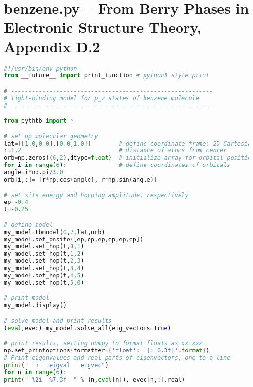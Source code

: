 \documentclass{cthhw}
\begin{document}
\section*{{\sc benzene.py} -- From Berry Phases in Electronic Structure Theory, Appendix D.2}
\begin{lstlisting}[language=Python]
#!/usr/bin/env python
from __future__ import print_function # python3 style print

# ----------------------------------------------------------
# Tight-binding model for p_z states of benzene molecule
# ----------------------------------------------------------

from pythtb import *

# set up molecular geometry
lat=[[1.0,0.0],[0.0,1.0]]        # define coordinate frame: 2D Cartesian
r=1.2                            # distance of atoms from center
orb=np.zeros((6,2),dtype=float)  # initialize array for orbital positions
for i in range(6):               # define coordinates of orbitals
angle=i*np.pi/3.0
orb[i,:]= [r*np.cos(angle), r*np.sin(angle)]

# set site energy and hopping amplitude, respectively
ep=-0.4
t=-0.25

# define model
my_model=tbmodel(0,2,lat,orb)
my_model.set_onsite([ep,ep,ep,ep,ep,ep])
my_model.set_hop(t,0,1)
my_model.set_hop(t,1,2)
my_model.set_hop(t,2,3)
my_model.set_hop(t,3,4)
my_model.set_hop(t,4,5)
my_model.set_hop(t,5,0)

# print model
my_model.display()

# solve model and print results
(eval,evec)=my_model.solve_all(eig_vectors=True)

# print results, setting numpy to format floats as xx.xxx
np.set_printoptions(formatter={'float': '{: 6.3f}'.format})
# Print eigenvalues and real parts of eigenvectors, one to a line
print("  n   eigval   eigvec")
for n in range(6):
print(" %2i  %7.3f  " % (n,eval[n]), evec[n,:].real)
\end{lstlisting}
	
\end{document}
